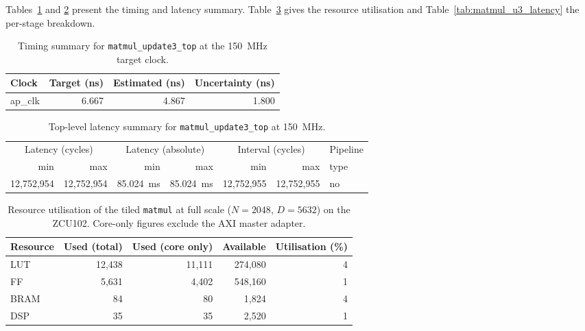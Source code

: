 Tables~\ref{tab:matmul_u3_timing} and \ref{tab:matmul_u3_top_latency}
present the timing and latency summary. Table~\ref{tab:matmul_u3_resources}
gives the resource utilisation and Table~\ref{tab:matmul_u3_latency} the
per-stage breakdown.

\begin{table}[H]
  \centering
  \begin{tabular}{lrrr}
    \toprule
    Clock & Target (ns) & Estimated (ns) & Uncertainty (ns) \\
    \midrule
    ap\_clk & 6.667 & 4.867 & 1.800 \\
    \bottomrule
  \end{tabular}
  \caption{Timing summary for \texttt{matmul\_update3\_top} at the
           \SI{150}{\mega\hertz} target clock.}
  \label{tab:matmul_u3_timing}
\end{table}

\begin{table}[H]
  \centering
  \begin{tabular}{rrrrrrl}
    \toprule
    \multicolumn{2}{c}{Latency (cycles)} &
    \multicolumn{2}{c}{Latency (absolute)} &
    \multicolumn{2}{c}{Interval (cycles)} & Pipeline \\
    min & max & min & max & min & max & type \\
    \midrule
    12{,}752{,}954 & 12{,}752{,}954 & \SI{85.024}{\milli\second} & \SI{85.024}{\milli\second} & 12{,}752{,}955 & 12{,}752{,}955 & no \\
    \bottomrule
  \end{tabular}
  \caption{Top-level latency summary for \texttt{matmul\_update3\_top}
           at \SI{150}{\mega\hertz}.}
  \label{tab:matmul_u3_top_latency}
\end{table}

\begin{table}[H]
  \centering
  \begin{tabular}{lrrrr}
    \toprule
    Resource & Used (total) & Used (core only) & Available & Utilisation (\%) \\
    \midrule
    LUT  & 12{,}438 & 11{,}111 & 274{,}080 &  4 \\
    FF   &  5{,}631 &  4{,}402 & 548{,}160 &  1 \\
    BRAM &       84 &       80 &   1{,}824 &  4 \\
    DSP  &       35 &       35 &   2{,}520 &  1 \\
    \bottomrule
  \end{tabular}
  \caption{Resource utilisation of the tiled \texttt{matmul} at full scale
           ($N = 2048$, $D = 5632$) on the ZCU102. Core-only figures
           exclude the AXI master adapter.}
  \label{tab:matmul_u3_resources}
\end{table}

